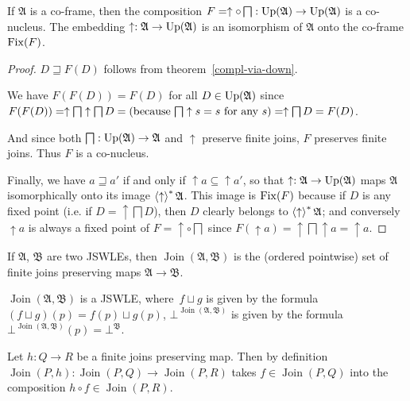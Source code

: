 \begin{cor}
\label{down-meet-co-nucleus}If $\mathfrak{A}$ is a co-frame, then
the composition $F=\uparrow\circ\bigsqcap:\operatorname{Up}(\mathfrak{A})\rightarrow\operatorname{Up}(\mathfrak{A})$
is a co-nucleus. The embedding $\uparrow:\mathfrak{A}\rightarrow\operatorname{Up}(\mathfrak{A})$
is an isomorphism of $\mathfrak{A}$ onto the co-frame $\operatorname{Fix}(F)$.\end{cor}
\begin{proof}
$D\sqsupseteq F(D)$ follows from theorem~\ref{compl-via-down}.

We have $F(F(D))=F(D)$ for all $D\in\operatorname{Up}(\mathfrak{A})$ since
$F(F(D))=\uparrow\bigsqcap\uparrow\bigsqcap D=\text{(because \ensuremath{\bigsqcap\uparrow s=s} for any \ensuremath{s})}=\uparrow\bigsqcap D=F(D)$.

And since both $\bigsqcap:\operatorname{Up}(\mathfrak{A})\rightarrow\mathfrak{A}$
and $\uparrow$ preserve finite joins, $F$ preserves finite joins.
Thus $F$ is a co-nucleus.

Finally, we have $a\sqsupseteq a'$ if and only if $\uparrow a\subseteq\uparrow a'$,
so that $\uparrow:\mathfrak{A}\rightarrow\operatorname{Up}(\mathfrak{A})$ maps
$\mathfrak{A}$ isomorphically onto its image $\left\langle \uparrow\right\rangle ^{\ast}\mathfrak{A}$.
This image is $\operatorname{Fix}(F)$ because if $D$ is any fixed point (i.e.
if $D=\uparrow\bigsqcap D$), then $D$ clearly belongs to $\left\langle \uparrow\right\rangle ^{\ast}\mathfrak{A}$;
and conversely $\uparrow a$ is always a fixed point of $F=\uparrow\circ\bigsqcap$
since $F(\uparrow a)=\uparrow\bigsqcap\uparrow a=\uparrow a$.\end{proof}
\begin{defn}
If $\mathfrak{A}$, $\mathfrak{B}$ are two JSWLEs, then $\operatorname{Join}(\mathfrak{A},\mathfrak{B})$
is the (ordered pointwise) set of finite joins preserving maps $\mathfrak{A}\rightarrow\mathfrak{B}$.\end{defn}
\begin{obvious}
$\operatorname{Join}(\mathfrak{A},\mathfrak{B})$ is a JSWLE, where~$f\sqcup g$
is given by the formula $(f\sqcup g)(p)=f(p)\sqcup g(p)$, $\bot^{\operatorname{Join}(\mathfrak{A},\mathfrak{B})}$
is given by the formula $\bot^{\operatorname{Join}(\mathfrak{A},\mathfrak{B})}(p)=\bot^{\mathfrak{B}}$.\end{obvious}
\begin{defn}
Let $h:Q\rightarrow R$ be a finite joins preserving map. Then by
definition $\operatorname{Join}(P,h):\operatorname{Join}(P,Q)\rightarrow\operatorname{Join}(P,R)$
takes $f\in\operatorname{Join}(P,Q)$ into the composition $h\circ f\in\operatorname{Join}(P,R)$.\end{defn}
